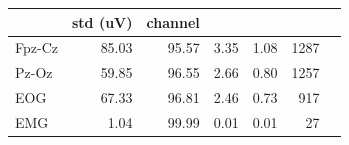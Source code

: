 \begin{tabular}{lrrrrr}
\toprule
 & std (uV) & %
channel &  &  &  &  &  \\
\midrule
Fpz-Cz & 85.03 & 95.57 & 3.35 & 1.08 & 1287 \\
Pz-Oz & 59.85 & 96.55 & 2.66 & 0.80 & 1257 \\
EOG & 67.33 & 96.81 & 2.46 & 0.73 & 917 \\
EMG & 1.04 & 99.99 & 0.01 & 0.01 & 27 \\
\bottomrule
\end{tabular}
